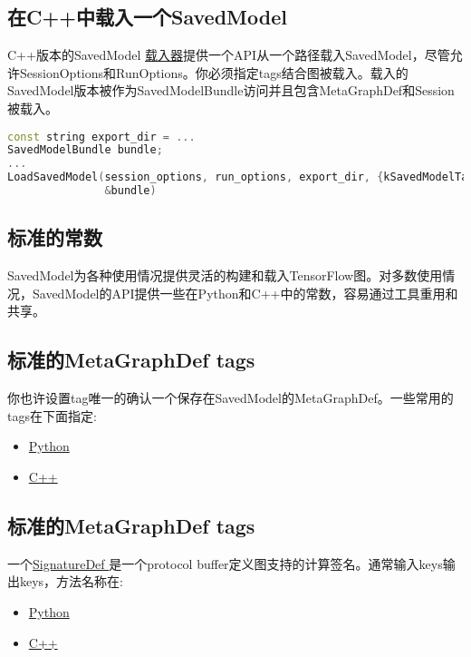 \subsection{在C++中载入一个SavedModel}
C++版本的SavedModel \href{https://github.com/tensorflow/tensorflow/blob/master/tensorflow/cc/saved_model/loader.h}{载入器}提供一个API从一个路径载入SavedModel，尽管允许SessionOptions和RunOptions。你必须指定tags结合图被载入。载入的SavedModel版本被作为SavedModelBundle访问并且包含MetaGraphDef和Session被载入。
\begin{lstlisting}[language=C++]
const string export_dir = ...
SavedModelBundle bundle;
...
LoadSavedModel(session_options, run_options, export_dir, {kSavedModelTagTrain},
               &bundle)
\end{lstlisting}
\subsection{标准的常数}
SavedModel为各种使用情况提供灵活的构建和载入TensorFlow图。对多数使用情况，SavedModel的API提供一些在Python和C++中的常数，容易通过工具重用和共享。
\subsection{标准的MetaGraphDef tags}
你也许设置tag唯一的确认一个保存在SavedModel的MetaGraphDef。一些常用的tags在下面指定:
\begin{itemize}
\item \href{https://github.com/tensorflow/tensorflow/blob/master/tensorflow/python/saved_model/tag_constants.py}{Python}
\item \href{https://github.com/tensorflow/tensorflow/blob/master/tensorflow/cc/saved_model/tag_constants.h}{C++}
\end{itemize}
\subsection{标准的MetaGraphDef tags}
一个\href{https://github.com/tensorflow/tensorflow/blob/master/tensorflow/core/protobuf/meta_graph.proto}{SignatureDef }是一个protocol buffer定义图支持的计算签名。通常输入keys输出keys，方法名称在:
\begin{itemize}
\item \href{https://github.com/tensorflow/tensorflow/blob/master/tensorflow/python/saved_model/signature_constants.py}{Python}
\item \href{https://github.com/tensorflow/tensorflow/blob/master/tensorflow/cc/saved_model/signature_constants.h}{C++}
\end{itemize}
